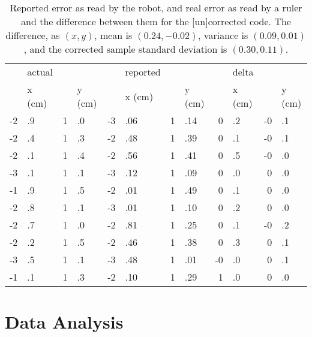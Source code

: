 \documentclass[twocolumn]{article}
\begin{document}
\begin{table*}[htb]
\begin{center}\begin{tabular}{r@{}l r@{}l r@{}l r@{}l r@{}l r@{}l}
&actual&&& &reported&&& &delta&& \\
&x (cm)& &y (cm)& &x (cm)& &y (cm)& &x (cm)& &y (cm) \\
\hline
-2&.9& 1&.0& -3&.06& 1&.14& 0&.2& -0&.1 \\
-2&.4& 1&.3& -2&.48& 1&.39& 0&.1& -0&.1 \\
-2&.1& 1&.4& -2&.56& 1&.41& 0&.5& -0&.0 \\
-3&.1& 1&.1& -3&.12& 1&.09& 0&.0& 0&.0 \\
-1&.9& 1&.5& -2&.01& 1&.49& 0&.1& 0&.0 \\
-2&.8& 1&.1& -3&.01& 1&.10& 0&.2& 0&.0 \\
-2&.7& 1&.0& -2&.81& 1&.25& 0&.1& -0&.2 \\
-2&.2& 1&.5& -2&.46& 1&.38& 0&.3& 0&.1 \\
-3&.5& 1&.1& -3&.48& 1&.01& -0&.0& 0&.1 \\
-1&.1& 1&.3& -2&.10& 1&.29& 1&.0& 0&.0 \\
\end{tabular}\end{center}
\caption{Reported error as read by the robot, and real error as read by a ruler and the difference between them for the [un]corrected code.
The difference, as $(x, y)$, mean is $(0.24, -0.02)$, variance is $(0.09, 0.01)$, and the corrected sample standard deviation is $(0.30, 0.11)$.}
\label{b}
\end{table*}

\section{Data Analysis}
\end{document}
